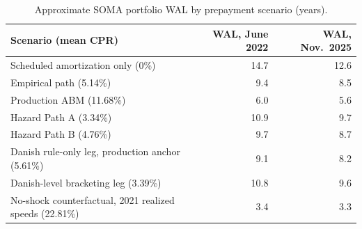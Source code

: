 \documentclass[12pt]{article}
\begin{document}
\begin{table}[H]
\centering
\small
\begin{threeparttable}
\caption{Approximate SOMA portfolio WAL by prepayment scenario (years).}
\label{tab:wal}
\begin{tabular}{@{}lrr@{}}
\toprule
Scenario (mean CPR) & WAL, June 2022 & WAL, Nov.\ 2025 \\
\midrule
Scheduled amortization only (0\%) & 14.7 & 12.6 \\
Empirical path (5.14\%) & 9.4 & 8.5 \\
Production ABM (11.68\%) & 6.0 & 5.6 \\
Hazard Path A (3.34\%) & 10.9 & 9.7 \\
Hazard Path B (4.76\%) & 9.7 & 8.7 \\
Danish rule-only leg, production anchor (5.61\%) & 9.1 & 8.2 \\
Danish-level bracketing leg (3.39\%) & 10.8 & 9.6 \\
No-shock counterfactual, 2021 realized speeds (22.81\%) & 3.4 & 3.3 \\
\bottomrule
\end{tabular}
\begin{tablenotes}[flushleft]\footnotesize

\end{tablenotes}
\end{threeparttable}
\end{table}
\end{document}
